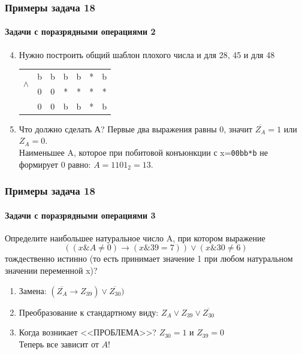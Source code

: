 \begin{frame}[t]
\frametitle{Примеры задача 18}
\framesubtitle{Задачи с поразрядными операциями 2}

	\begin{enumerate}
	\setcounter{enumi}{3}
		\item 
				
		Нужно построить общий шаблон плохого числа и для 28, 45 и для 48\\ 	\pause 
		\begin{tabular}{ccccccc}
\multirow{2}{*}{$\wedge$}
 & b & b & b & b & * & b\tabularnewline
 & 0 & 0 & * & * & * & *\tabularnewline
\cline{2-7} \cline{3-7} \cline{4-7} \cline{5-7} \cline{6-7} \cline{7-7} 
 & 0 & 0 & b & b & * & b\tabularnewline
\end{tabular}
		
		
		\item Что должно сделать А? Первые два выражения равны 0, значит $\overline{Z_A}=1$ или
		$Z_A=0$.\\ 	\pause 
		Наименьшее A, которое при побитовой конъюнкции с x=\texttt{00bb*b} не формирует 0 равно: $A=1101_2=13$.
					
	\end{enumerate}
	
	
\end{frame}



\begin{frame}[t]
\frametitle{Примеры задача 18}
\framesubtitle{Задачи с поразрядными операциями 3}

Определите наибольшее натуральное число A, при котором выражение
$$((x \& A \neq 0) \rightarrow (x \& 39 = 7)) \vee (x \& 30 \neq 6)$$
тождественно истинно (то есть принимает значение 1 при любом натуральном значении переменной x)?

	\begin{enumerate}
		\item Замена:  $(\overline{Z_{A}}\rightarrow Z_{39}) \vee  \overline{Z_30})$ 	\pause 
		\item Преобразование к стандартному виду: 
		$Z_{A} \vee Z_{39} \vee \overline{Z_{30}}$ 	\pause 
		\item Когда возникает <<ПРОБЛЕМА>>? 
		      $Z_{30}=1$ и $Z_{39}=0$ \\Теперь все зависит от $A$!
					
	\end{enumerate}
	
	
\end{frame}



